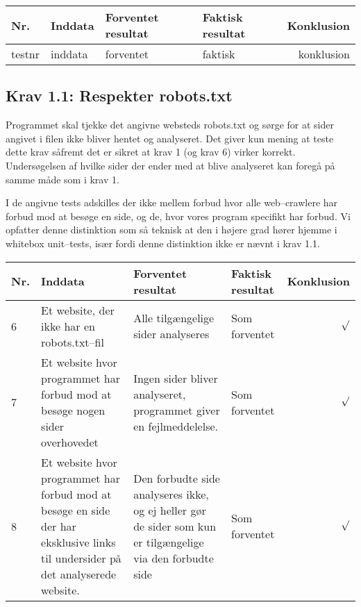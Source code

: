 \documentclass[a4paper,oneside,article]{memoir}
\begin{document}
\begin{landscape}
\begin{longtable}[c]{p{20pt}|p{220pt}|p{130pt}|p{130pt}|r}
\end{longtable}

\begin{longtable}[c]{p{20pt}|p{220pt}|p{130pt}|p{130pt}|r}
\textbf{Nr.} &
\textbf{Inddata} &
\textbf{Forventet resultat} &
\textbf{Faktisk resultat} &
\textbf{Konklusion} \\ \hline

testnr &
inddata &
forventet &
faktisk &
konklusion \\ \hline
\end{longtable}

\subsection{Krav 1.1: Respekter robots.txt}

Programmet skal tjekke det angivne websteds robots.txt og sørge for at
sider angivet i filen ikke bliver hentet og analyseret. Det giver kun
mening at teste dette krav såfremt det er sikret at krav 1 (og krav 6)
virker korrekt. Undersøgelsen af hvilke sider der ender med at blive
analyseret kan foregå på samme måde som i krav 1.

I de angivne tests adskilles der ikke mellem forbud hvor alle
web--crawlere har forbud mod at besøge en side, og de, hvor vores
program specifikt har forbud. Vi opfatter denne distinktion som så
teknisk at den i højere grad hører hjemme i whitebox unit--tests, især
fordi denne distinktion ikke er nævnt i krav 1.1.

\begin{longtable}[c]{p{20pt}|p{220pt}|p{130pt}|p{130pt}|r}
\textbf{Nr.} &
\textbf{Inddata} &
\textbf{Forventet resultat} &
\textbf{Faktisk resultat} &
\textbf{Konklusion} \\ \hline

6 &
Et website, der ikke har en robots.txt--fil &
Alle tilgængelige sider analyseres &
Som forventet &
$\surd$ \\ \hline

7 &
Et website hvor programmet har forbud mod at besøge nogen sider
overhovedet &
Ingen sider bliver analyseret, programmet giver en fejlmeddelelse. &
Som forventet &
$\surd$ \\ \hline

8 &
Et website hvor programmet har forbud mod at besøge en side der har
eksklusive links til undersider på det analyserede website. &
Den forbudte side analyseres ikke, og ej heller gør de sider som kun
er tilgængelige via den forbudte side &
Som forventet &
$\surd$ \\ \hline


\end{longtable}
\end{landscape}
\end{document}
